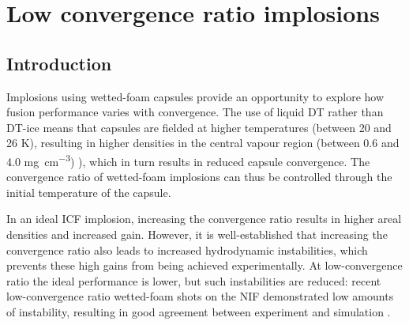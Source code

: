 

\chapter{Low convergence ratio implosions} \label{ch-lowCR}

\minitoc

\section{Introduction}


Implosions using wetted-foam capsules provide an opportunity to explore how fusion performance varies with convergence. The use of liquid DT rather than DT-ice means that capsules are fielded at higher temperatures (between 20 and 26 K), resulting in higher densities in the central vapour  region (between 0.6 and 4.0 \unit{\milli\gram\per\centi\meter\cubed}) \cite{Olson2016}), which in turn results in reduced capsule convergence. The convergence ratio of wetted-foam implosions can thus be controlled through the initial temperature of the capsule.

In an ideal ICF implosion, increasing the convergence ratio results in higher areal densities and increased gain. However, it is well-established that increasing the convergence ratio also leads to increased hydrodynamic instabilities, which prevents these high gains from being achieved experimentally. At low-convergence ratio the ideal performance is lower, but such instabilities are reduced: recent low-convergence ratio wetted-foam shots on the NIF demonstrated low amounts of instability, resulting in good agreement between experiment and simulation \cite{Olson2016, Zylstra2018}. 

